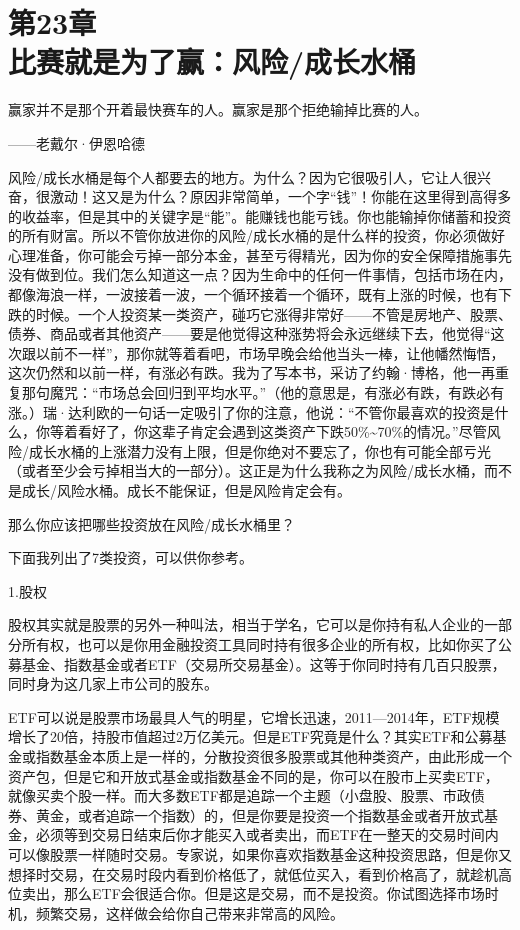 
\section[第23章\q 比赛就是为了赢：风险/成长水桶]{第23章\\ 比赛就是为了赢：风险/成长水桶}

\begin{BookQuote}
赢家并不是那个开着最快赛车的人。赢家是那个拒绝输掉比赛的人。

\hfill ——老戴尔·伊恩哈德
\end{BookQuote}

风险/成长水桶是每个人都要去的地方。为什么？因为它很吸引人，它让人很兴奋，很激动！这又是为什么？原因非常简单，一个字“钱”！你能在这里得到高得多的收益率，但是其中的关键字是“能”。能赚钱也能亏钱。你也能输掉你储蓄和投资的所有财富。所以不管你放进你的风险/成长水桶的是什么样的投资，你必须做好心理准备，你可能会亏掉一部分本金，甚至亏得精光，因为你的安全保障措施事先没有做到位。我们怎么知道这一点？因为生命中的任何一件事情，包括市场在内，都像海浪一样，一波接着一波，一个循环接着一个循环，既有上涨的时候，也有下跌的时候。一个人投资某一类资产，碰巧它涨得非常好——不管是房地产、股票、债券、商品或者其他资产——要是他觉得这种涨势将会永远继续下去，他觉得“这次跟以前不一样”，那你就等着看吧，市场早晚会给他当头一棒，让他幡然悔悟，这次仍然和以前一样，有涨必有跌。我为了写本书，采访了约翰·博格，他一再重复那句魔咒：“市场总会回归到平均水平。”（他的意思是，有涨必有跌，有跌必有涨。）瑞·达利欧的一句话一定吸引了你的注意，他说：“不管你最喜欢的投资是什么，你等着看好了，你这辈子肯定会遇到这类资产下跌50\%\textasciitilde{}70\%的情况。”尽管风险/成长水桶的上涨潜力没有上限，但是你绝对不要忘了，你也有可能全部亏光（或者至少会亏掉相当大的一部分）。这正是为什么我称之为风险/成长水桶，而不是成长/风险水桶。成长不能保证，但是风险肯定会有。

那么你应该把哪些投资放在风险/成长水桶里？

下面我列出了7类投资，可以供你参考。

1.股权

股权其实就是股票的另外一种叫法，相当于学名，它可以是你持有私人企业的一部分所有权，也可以是你用金融投资工具同时持有很多企业的所有权，比如你买了公募基金、指数基金或者ETF（交易所交易基金）。这等于你同时持有几百只股票，同时身为这几家上市公司的股东。

ETF可以说是股票市场最具人气的明星，它增长迅速，2011—2014年，ETF规模增长了20倍，持股市值超过2万亿美元。但是ETF究竟是什么？其实ETF和公募基金或指数基金本质上是一样的，分散投资很多股票或其他种类资产，由此形成一个资产包，但是它和开放式基金或指数基金不同的是，你可以在股市上买卖ETF，就像买卖个股一样。而大多数ETF都是追踪一个主题（小盘股、股票、市政债券、黄金，或者追踪一个指数）的，但是你要是投资一个指数基金或者开放式基金，必须等到交易日结束后你才能买入或者卖出，而ETF在一整天的交易时间内可以像股票一样随时交易。专家说，如果你喜欢指数基金这种投资思路，但是你又想择时交易，在交易时段内看到价格低了，就低位买入，看到价格高了，就趁机高位卖出，那么ETF会很适合你。但是这是交易，而不是投资。你试图选择市场时机，频繁交易，这样做会给你自己带来非常高的风险。

